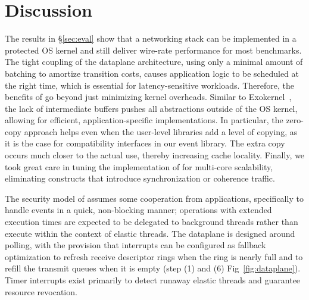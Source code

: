 
\section{Discussion}
\label{sec:disc}


 The results in \S\ref{sec:eval}
show that a networking stack can be implemented in a protected OS
kernel and still deliver wire-rate performance for most benchmarks.
The tight coupling of the dataplane architecture, using only a minimal
amount of batching to amortize transition costs, causes application
logic to be scheduled at the right time, which is essential for
latency-sensitive workloads.  Therefore, the benefits of \ix go beyond
just minimizing kernel overheads. Similar to
Exokernel~\cite{DBLP:conf/sosp/EnglerKO95}, the lack of intermediate
buffers pushes all abstractions outside of the OS kernel, allowing for
efficient, application-specific implementations.  In particular, the
zero-copy approach helps even when the user-level libraries add a
level of copying, as it is the case for compatibility interfaces in
our event library.  The extra copy occurs much closer to the actual
use, thereby increasing cache locality.  Finally, we took great care
in tuning the implementation of \ix for multi-core scalability,
eliminating constructs that introduce synchronization or coherence
traffic.

The security model of \ix assumes some cooperation from applications,
specifically to handle events in a quick, non-blocking manner;
operations with extended execution times are expected to be delegated
to background threads rather than execute within the context of
elastic threads.  The \ix dataplane is designed around polling, with
the provision that interrupts can be configured as fallback
optimization to refresh receive descriptor rings when the ring is
nearly full and to refill the transmit queues when it is empty (step
(1) and (6) Fig~\ref{fig:dataplane}).  Timer interrupts exist
primarily to detect runaway elastic threads and guarantee resource
revocation.


